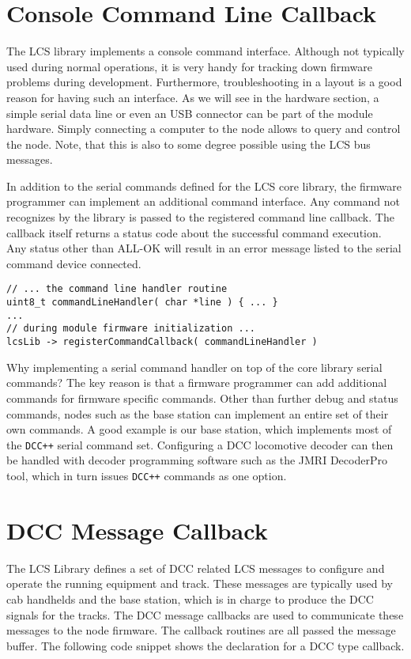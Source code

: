 \section{Console Command Line Callback}

The LCS library implements a console command interface. Although not typically used during normal operations, it is very handy for tracking down firmware problems during development. Furthermore, troubleshooting in a layout is a good reason for having such an interface. As we will see in the hardware section, a simple serial data line or even an USB connector can be part of the module hardware. Simply connecting a computer to the node allows to query and control the node. Note, that this is also to some degree possible using the LCS bus messages.

In addition to the serial commands defined for the LCS  core library, the firmware programmer can implement an additional command interface. Any command not recognizes by the library is passed to the registered command line callback. The callback itself returns a status code about the successful command execution. Any status other than ALL-OK will result in an error message listed to the serial command device connected.

\lstset{style=codesnippetstyle}
\begin{lstlisting}
// ... the command line handler routine
uint8_t commandLineHandler( char *line ) { ... }
...
// during module firmware initialization ...
lcsLib -> registerCommandCallback( commandLineHandler )
\end{lstlisting}

Why implementing a serial command handler on top of the core library serial commands? The key reason is that a firmware programmer can add additional commands for firmware specific commands. Other than further debug and status commands, nodes such as the base station can implement an entire set of their own commands. A good example is our base station, which implements most of the \texttt{DCC++} serial command set. Configuring a DCC locomotive decoder can then be handled with decoder programming software such as the JMRI DecoderPro tool, which in turn issues \texttt{DCC++} commands as one option.

\section{DCC Message Callback}

The LCS Library defines a set of DCC related LCS messages to configure and operate the running equipment and track. These messages are typically used by cab handhelds and the base station, which is in charge to produce the DCC signals for the tracks. The DCC message callbacks are used to communicate these messages to the node firmware. The callback routines are all passed the message buffer. The following code snippet shows the declaration for a DCC type callback.

